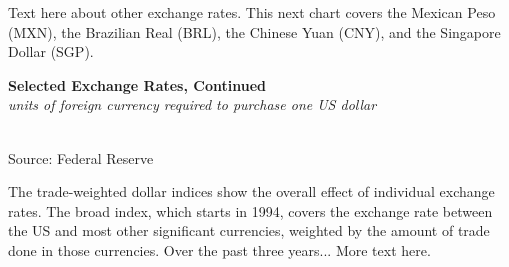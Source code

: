 \documentclass{report}
\makeatletter
\newcommand{\tbllink}[1]{\href{https://raw.githubusercontent.com/bdecon/US-chartbook/master/chartbook/data/#1}{\faTable}}
\newcommand*\short[1]{\expandafter\@gobbletwo\number\numexpr#1\relax}
\newcommand{\stdnode}[3]{\node[below, align=left, shift=({#1,#2})]{#3};}
\newcommand{\dateaxisticks}{
		date coordinates in=x, axis line style={draw=none},
		xmax={2020-02-01},
		max space between ticks=40,	    
		xtick={{1990-01-01}, {1992-01-01}, {1994-01-01}, 
			{1996-01-01}, {1998-01-01}, {2000-01-01}, 
			{2002-01-01}, {2004-01-01}, {2006-01-01},
			{2008-01-01}, {2010-01-01}, {2012-01-01}, {2014-01-01},
		    {2016-01-01}, {2018-01-01}, {2020-01-01}},
		minor xtick={{1989-01-01}, {1991-01-01}, {1993-01-01},
			{1995-01-01}, {1997-01-01}, {1999-01-01}, 
			{2001-01-01}, {2003-01-01}, {2005-01-01}, {2007-01-01},
		    {2009-01-01}, {2011-01-01}, {2013-01-01}, {2015-01-01},
		    {2017-01-01}, {2019-01-01}},
		enlarge y limits={0.06}, enlarge x limits={0.01},
		}
\newcommand{\bbar}[2]{extra #1 ticks = {{#2}}, extra #1 tick labels = ,
		extra #1 tick style = {grid=major, grid style={thick, black!25}},}
\newcommand{\stdline}[4]{\addplot[very thick, no markers, color=#1] 
		table [x=#2, y=#3, col sep=comma] {#4};	}
\newcommand{\rbars}{
		\fill[color=black!10] (axis cs:{1990-07-01},\pgfkeysvalueof{/pgfplots/ymin}) rectangle 
			(axis cs:{1991-03-01}, \pgfkeysvalueof{/pgfplots/ymax});
		\fill[color=black!10] (axis cs:{2007-12-01},\pgfkeysvalueof{/pgfplots/ymin}) rectangle 
			(axis cs:{2009-07-01}, \pgfkeysvalueof{/pgfplots/ymax});
		\fill[color=black!10] (axis cs:{2001-03-01},\pgfkeysvalueof{/pgfplots/ymin}) rectangle 
			(axis cs:{2001-11-01}, \pgfkeysvalueof{/pgfplots/ymax});}
\makeatother
\begin{document}
{{{{\begin{minipage}{0.76\textwidth}
\vspace{4mm}

\small Text here about other exchange rates. This next chart covers the Mexican Peso (MXN), the Brazilian Real (BRL), the Chinese Yuan (CNY), and the Singapore Dollar (SGP).\\

\vspace{2mm}

\noindent \normalsize \textbf{Selected Exchange Rates, Continued}\\
\footnotesize{\textit{units of foreign currency required to purchase one US dollar}}\\
\noindent \hspace*{-2mm} \\
\footnotesize{Source: Federal Reserve} \hfill \tbllink{fx2.csv}\\

\vspace{4mm}

\small The trade-weighted dollar indices show the overall effect of individual exchange rates. The broad index, which starts in 1994, covers the exchange rate between the US and most other significant currencies, weighted by the amount of trade done in those currencies. Over the past three years... More text here.\\

\vspace{2mm}


\end{minipage}}}}}
\end{document}
